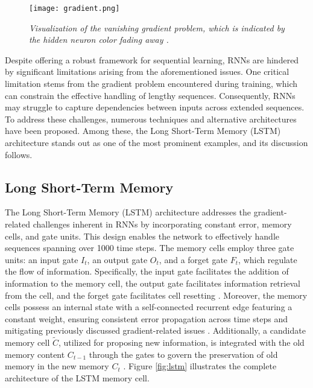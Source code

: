 \begin{figure}[H]
    \centering
    \texttt{[image: gradient.png]}
    \caption{
        \it{Visualization of the vanishing gradient problem, which is indicated by the
            hidden neuron color fading away \cite{lipton2015critical}.}
    }
    \label{fig:gradient}
\end{figure}

Despite offering a robust framework for sequential learning, RNNs are hindered by significant limitations arising from the aforementioned issues. One critical limitation stems from the gradient problem encountered during training, which can constrain the effective handling of lengthy sequences. Consequently, RNNs may struggle to capture dependencies between inputs across extended sequences. To address these challenges, numerous techniques and alternative architectures have been proposed. Among these, the Long Short-Term Memory (LSTM) architecture stands out as one of the most prominent examples, and its discussion follows.

\subsection{Long Short-Term Memory}

The Long Short-Term Memory (LSTM) \cite{10.1162/neco.1997.9.8.1735} architecture addresses the gradient-related challenges inherent in RNNs by incorporating constant error, memory cells, and gate units. This design enables the network to effectively handle sequences spanning over 1000 time steps. The memory cells employ three gate units: an input gate \(I_t\), an output gate \(O_t\), and a forget gate \(F_t\), which regulate the flow of information. Specifically, the input gate facilitates the addition of information to the memory cell, the output gate facilitates information retrieval from the cell, and the forget gate facilitates cell resetting \cite{schmidt2019recurrent}. Moreover, the memory cells possess an internal state with a self-connected recurrent edge featuring a constant weight, ensuring consistent error propagation across time steps and mitigating previously discussed gradient-related issues \cite{lipton2015critical}. Additionally, a candidate memory cell \(\tilde{C}\), utilized for proposing new information, is integrated with the old memory content \(C_{t-1}\) through the gates to govern the preservation of old memory in the new memory \(C_t\) \cite{schmidt2019recurrent}. Figure \ref{fig:lstm} illustrates the complete architecture of the LSTM memory cell.

